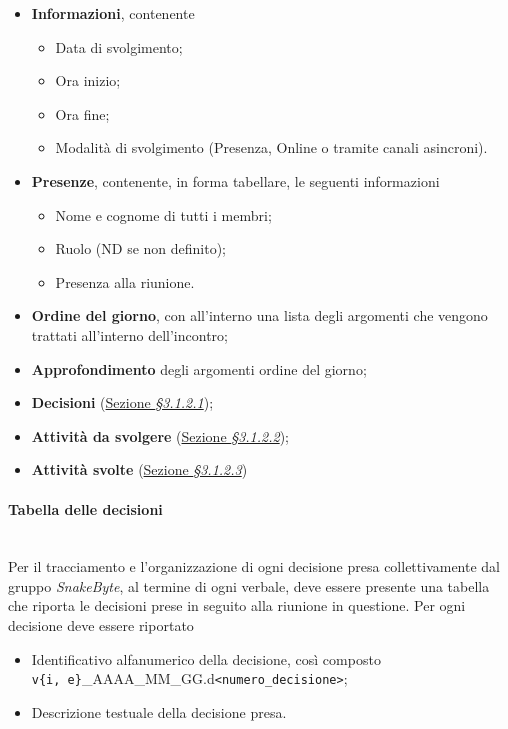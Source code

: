 \documentclass[10pt, letterpaper]{article}
\newcommand{\trisubsection}[1]{\paragraph{#1}\mbox{}\\}
\begin{document}
\begin{itemize}
    \item \textbf{Informazioni}, contenente
          \begin{itemize}
              \item Data di svolgimento;
              \item Ora inizio;
              \item Ora fine;
              \item Modalità di svolgimento (Presenza, Online o tramite canali asincroni).
          \end{itemize}
    \item \textbf{Presenze}, contenente, in forma tabellare, le seguenti informazioni
          \begin{itemize}
              \item Nome e cognome di tutti i membri;
              \item Ruolo (ND se non definito);
              \item Presenza alla riunione.
          \end{itemize}
    \item \textbf{Ordine del giorno}, con all'interno una lista degli argomenti che vengono trattati all'interno dell'incontro;
    \item \textbf{Approfondimento} degli argomenti ordine del giorno;
    \item \textbf{Decisioni} (\hyperref[sec:TabellaDecisioni]{Sezione \textit{§3.1.2.1}});
    \item \textbf{Attività da svolgere} (\hyperref[sec:TabellaToDo]{Sezione \textit{§3.1.2.2}});
    \item \textbf{Attività svolte} (\hyperref[sec:TabellaDone]{Sezione \textit{§3.1.2.3}})
\end{itemize}

\label{sec:TabellaDecisioni}
\trisubsection{Tabella delle decisioni}
Per il tracciamento e l'organizzazione di ogni decisione presa collettivamente dal gruppo \textit{SnakeByte}, al termine di ogni verbale, deve essere presente una tabella che riporta le decisioni prese in seguito alla riunione in questione. Per ogni decisione deve essere riportato
\begin{itemize}
    \item Identificativo alfanumerico della decisione, così composto\\ \texttt{v\{i, e\}}\_AAAA\_MM\_GG.d\texttt{<numero\_decisione>};
    \item Descrizione testuale della decisione presa.
\end{itemize}
\end{document}
